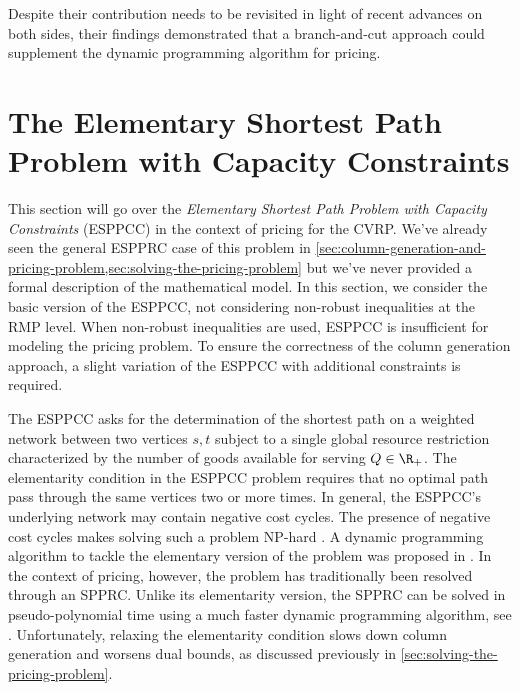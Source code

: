 Despite their contribution needs to be revisited in light of recent advances on both sides, their findings demonstrated that a branch-and-cut approach could supplement the dynamic programming algorithm for pricing.

\section{The Elementary Shortest Path Problem with Capacity Constraints}
\label{sec:the-elementary-shortest-path-problem-with-capacity-constraints}

This section will go over the \textit{Elementary Shortest Path Problem with Capacity Constraints} (ESPPCC)
in the context of pricing for the CVRP.
We've already seen the general ESPPRC case of this problem in
\cref{sec:column-generation-and-pricing-problem,sec:solving-the-pricing-problem}
but we've never provided a formal description of the mathematical model.
In this section, we consider the basic version of the ESPPCC,
not considering non-robust inequalities at the RMP level.
When non-robust inequalities are used, ESPPCC is insufficient for modeling the pricing problem.
To ensure the correctness of the column generation approach,
a slight variation of the ESPPCC with additional constraints is required.

The ESPPCC asks for the determination of the shortest path on a weighted network
between two vertices $s, t$
subject to a single global resource restriction characterized
by the number of goods available for serving $Q \in \R_{+}$.
The elementarity condition in the ESPPCC problem requires that
no optimal path pass through the same vertices two or more times.
In general, the ESPPCC's underlying network may contain negative cost cycles.
The presence of negative cost cycles makes solving such a problem NP-hard \parencite{dror1994}.
A dynamic programming algorithm
to tackle the elementary version of the problem
was proposed in \textcite{feillet2004}.
In the context of pricing, however, the problem has traditionally been resolved through an SPPRC.
Unlike its elementarity version, the SPPRC can be solved in pseudo-polynomial time
using a much faster dynamic programming algorithm, see \textcite{desrochers1992}.
Unfortunately, relaxing the elementarity condition
slows down column generation and worsens dual bounds,
as discussed previously in \cref{sec:solving-the-pricing-problem}.

\medskip

